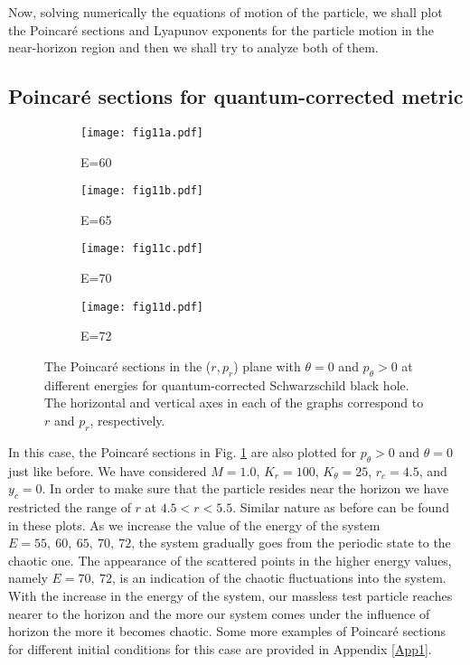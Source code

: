 \documentclass[aps,prd,showpacs,nofootinbib,floats,floatfix,preprintnumbers,groupedaddress,twocolumn]{revtex4-1}
\begin{document}
Now, solving numerically the equations of motion of the particle, we shall plot the Poincar\'e sections and Lyapunov exponents for the particle motion in the near-horizon region and then we shall try to analyze both of them.  




\subsection{Poincar\'e sections for quantum-corrected metric}
\par\noindent

\begin{figure}[htb!]
	\centering
	\begin{subfigure}[b]{0.39\linewidth}
		\texttt{[image: fig11a.pdf]}
		\caption{E=60}
	\end{subfigure}
	\begin{subfigure}[b]{0.4\linewidth}
		\texttt{[image: fig11b.pdf]}
		\caption{E=65}
	\end{subfigure}
	\begin{subfigure}[b]{0.4\linewidth}
		\texttt{[image: fig11c.pdf]}
		\caption{E=70}
	\end{subfigure}
	\begin{subfigure}[b]{0.4\linewidth}
		\texttt{[image: fig11d.pdf]}
		\caption{E=72}
	\end{subfigure}
	\caption{The Poincar\'e sections in the ($r,p_r$) plane with $\theta = 0$ and $p_\theta > 0$ at different energies for quantum-corrected Schwarzschild black hole. The horizontal and vertical axes in each of the graphs correspond to $r$ and $p_r$, respectively.}
	\label{fig:11}
\end{figure}
%
%
%
%
\par\noindent
In this case, the Poincar\'e sections in Fig. \ref{fig:11} are also plotted for $p_{\theta}>0$ and $\theta=0$ just like before. We have considered $M=1.0$, $K_r=100$, $K_\theta=25$, $r_c=4.5$, and $y_c=0$. In order to make sure that the particle resides near the horizon we have restricted the range of $r$ at $4.5<r<5.5$. Similar nature as before can be found in these plots. As we increase the value of the energy of the system $E=55,~60,~65,~70,~72$, the system gradually goes from the periodic state to the chaotic one. The appearance of the scattered points in the higher energy values, namely $E=70,~72$, is an indication of the chaotic fluctuations into the system. With the increase in the energy of the system, our massless test particle reaches nearer to the horizon and the more our system comes under the influence of horizon the more it becomes chaotic.  Some more examples of Poincar\'e sections for different initial conditions for this case are provided in Appendix \ref{App1}.
\end{document}
